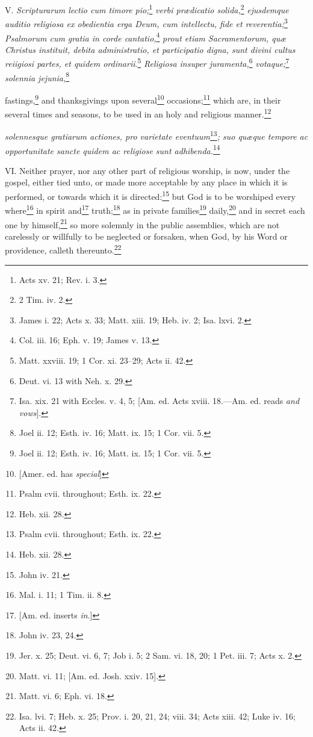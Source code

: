 V. \emph{Scripturarum lectio cum timore pio;}\footnote{Acts xv. 21; Rev. i. 3.}\emph{ verbi prædicatio solida,}\footnote{2 Tim. iv. 2.}\emph{ ejusdemque auditio religiosa ex obedientia erga Deum, cum intellectu, fide et reverentia;}\footnote{James i. 22; Acts x. 33; Matt. xiii. 19; Heb. iv. 2; Isa. lxvi. 2.}\emph{ Psalmorum cum gratia in corde cantatio,}\footnote{Col. iii. 16; Eph. v. 19; James v. 13.}\emph{ prout etiam Sacramentorum, quæ Christus instituit, debita administratio, et participatio digna, sunt divini cultus reiigiosi partes, et quidem ordinarii}.\footnote{Matt. xxviii. 19; 1 Cor. xi. 23–29; Acts ii. 42.}\emph{ Religiosa insuper juramenta,}\footnote{Deut. vi. 13 with Neh. x. 29.}\emph{ votaque;}\footnote{Isa. xix. 21 with Eccles. v. 4, 5; [Am. ed. Acts xviii. 18.—Am. ed. reads \emph{and vows}].}\emph{ solennia jejunia,}\footnote{Joel ii. 12; Esth. iv. 16; Matt. ix. 15; 1 Cor. vii. 5.}

fastings,\footnote{Joel ii. 12; Esth. iv. 16; Matt. ix. 15; 1 Cor. vii. 5.} and thanksgivings upon several\footnote{[Amer. ed. has \emph{special}]} occasions;\footnote{Psalm cvii. throughout; Esth. ix. 22.} which are, in their several times and seasons, to be used in an holy and religious manner.\footnote{Heb. xii. 28.}

\emph{solennesque gratiarum actiones, pro varietate eventuum}\footnote{Psalm cvii. throughout; Esth. ix. 22.}\emph{; suo quæque tempore ac opportunitate sancte quidem ac religiose sunt adhibenda.}\footnote{Heb. xii. 28.}

VI. Neither prayer, nor any other part of religious worship, is now, under the gospel, either tied unto, or made more acceptable by any place in which it is performed, or towards which it is directed:\footnote{John iv. 21.} but God is to be worshiped every where\footnote{Mal. i. 11; 1 Tim. ii. 8.} in spirit and\footnote{[Am. ed. inserts \emph{in}.]} truth;\footnote{John iv. 23, 24.} as in private families\footnote{Jer. x. 25; Deut. vi. 6, 7; Job i. 5; 2 Sam. vi. 18, 20; 1 Pet. iii. 7; Acts x. 2.} daily,\footnote{Matt. vi. 11; [Am. ed. Josh. xxiv. 15].} and in secret each one by himself,\footnote{Matt. vi. 6; Eph. vi. 18.} so more solemnly in the public assemblies, which are not carelessly or willfully to be neglected or forsaken, when God, by his Word or providence, calleth thereunto.\footnote{Isa. lvi. 7; Heb. x. 25; Prov. i. 20, 21, 24; viii. 34; Acts xiii. 42; Luke iv. 16; Acts ii. 42.}

